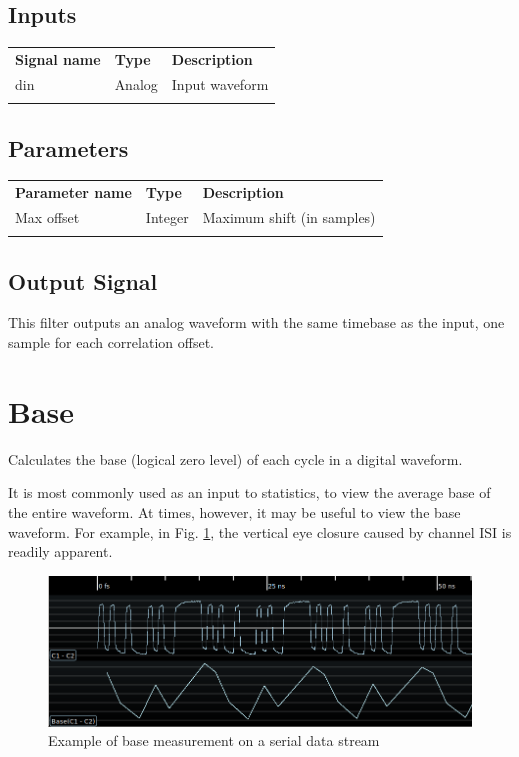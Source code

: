 \subsection{Inputs}

\begin{tabularx}{16cm}{llX}
\thickhline
\textbf{Signal name} & \textbf{Type} & \textbf{Description} \\
\thickhline
din & Analog & Input waveform \\
\thickhline
\end{tabularx}

\subsection{Parameters}

\begin{tabularx}{16cm}{llX}
\thickhline
\textbf{Parameter name} & \textbf{Type} & \textbf{Description} \\
\thickhline
Max offset & Integer & Maximum shift (in samples)\\
\thickhline
\end{tabularx}

\subsection{Output Signal}

This filter outputs an analog waveform with the same timebase as the input, one sample for each correlation offset.

\pagebreak
\section{Base}
\label{filter:base}

Calculates the base (logical zero level) of each cycle in a digital waveform.

It is most commonly used as an input to statistics, to view the average base of the entire waveform. At times, however,
it may be useful to view the base waveform. For example, in Fig. \ref{filter_base}, the vertical eye closure caused by
channel ISI is readily apparent.

\begin{figure}[h]
\centering
\includegraphics[width=16cm]{images/filters/base.png}
\caption{Example of base measurement on a serial data stream}
\label{filter_base}
\end{figure}

